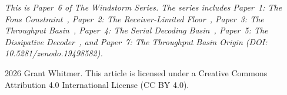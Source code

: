 \documentclass[11pt]{article}
\begin{document}
\bigskip
\noindent\emph{This is Paper~6 of The Windstorm Series. The series includes Paper~1: The Fons Constraint~\cite{whitmer2026fons}, Paper~2: The Receiver-Limited Floor~\cite{whitmer2026floor}, Paper~3: The Throughput Basin~\cite{whitmer2026basin}, Paper~4: The Serial Decoding Basin~\cite{whitmer2026serial}, Paper~5: The Dissipative Decoder~\cite{whitmer2026dissipative}, and Paper~7: The Throughput Basin Origin (DOI: 10.5281/zenodo.19498582).}

\bigskip
\noindent\textcopyright{} 2026 Grant Whitmer. This article is licensed under a Creative Commons Attribution 4.0 International License (CC BY 4.0).
\end{document}
